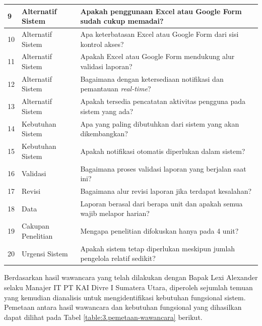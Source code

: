 \begin{longtable}{|p{}|p{}|p{}|}
    \hline
    9 & Alternatif Sistem & Apakah penggunaan Excel atau Google Form sudah cukup memadai? \\
    \hline
    10 & Alternatif Sistem & Apa keterbatasan Excel atau Google Form dari sisi kontrol akses? \\
    \hline
    11 & Alternatif Sistem & Apakah Excel atau Google Form mendukung alur validasi laporan? \\
    \hline
    12 & Alternatif Sistem & Bagaimana dengan ketersediaan notifikasi dan pemantauan \textit{real-time}? \\
    \hline
    13 & Alternatif Sistem & Apakah tersedia pencatatan aktivitas pengguna pada sistem yang ada? \\
    \hline
    14 & Kebutuhan Sistem & Apa yang paling dibutuhkan dari sistem yang akan dikembangkan? \\
    \hline
    15 & Kebutuhan Sistem & Apakah notifikasi otomatis diperlukan dalam sistem? \\
    \hline
    16 & Validasi & Bagaimana proses validasi laporan yang berjalan saat ini? \\
    \hline
    17 & Revisi & Bagaimana alur revisi laporan jika terdapat kesalahan? \\
    \hline
    18 & Data & Laporan berasal dari berapa unit dan apakah semua wajib melapor harian? \\
    \hline
    19 & Cakupan Penelitian & Mengapa penelitian difokuskan hanya pada 4 unit? \\
    \hline
    20 & Urgensi Sistem & Apakah sistem tetap diperlukan meskipun jumlah pengelola relatif sedikit? \\
    \hline
\end{longtable}

Berdasarkan hasil wawancara yang telah dilakukan dengan Bapak Lexi Alexander selaku Manajer IT PT KAI Divre I Sumatera Utara, diperoleh sejumlah temuan yang kemudian dianalisis untuk mengidentifikasi kebutuhan fungsional sistem. Pemetaan antara hasil wawancara dan kebutuhan fungsional yang dihasilkan dapat dilihat pada Tabel \ref{table:3.pemetaan-wawancara} berikut. \par

